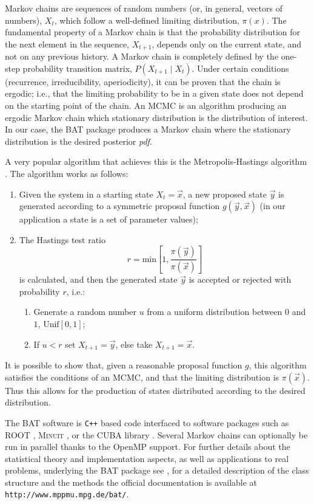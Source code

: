 Markov chains are sequences of random numbers (or, in general, vectors of numbers), $X_t$, which follow a well-defined limiting distribution, $\pi(x)$. The fundamental property of a Markov chain is that the probability distribution for the next element in the sequence, $X_{t+1}$, depends only on the current state, and not on any previous history. A Markov chain is completely defined by the one-step probability transition matrix, $P(X_{t+1}\mid X_t)$. Under certain conditions (recurrence, irreducibility, aperiodicity), it can be proven that the chain is ergodic; i.e., that the limiting probability to be in a given state does not depend on the starting point of the chain. An MCMC is an algorithm producing an ergodic Markov chain which stationary distribution is the distribution of interest. In our case, the BAT package produces a Markov chain where the stationary distribution is the desired posterior \emph{pdf}.

A very popular algorithm that achieves this is the Metropolis-Hastings algorithm \cite{Metropolis,Hastings}. The algorithm works as follows:
\begin{enumerate}
	\item Given the system in a starting state $X_t=\vec{x}$, a new proposed state $\vec{y}$ is generated according to a symmetric proposal function $g(\vec{y},\vec{x})$ (in our application a state is a set of parameter values);
	\item The Hastings test ratio
		\[r=\text{min}\left[1,\frac{\pi(\vec{y})}{\pi(\vec{x})}\right]\]
		is calculated, and then the generated state $\vec{y}$ is accepted or rejected with probability $r$, i.e.:
		\begin{enumerate}
			\item Generate a random number $u$ from a uniform distribution between $0$ and $1$, $\text{Unif}[0,1]$;
			\item If $u<r$ set $X_{t+1}=\vec{y}$, else take $X_{t+1}=\vec{x}$.
		\end{enumerate}
\end{enumerate}
It is possible to show that, given a reasonable proposal function $g$, this algorithm satisfies the conditions of an MCMC, and that the limiting distribution is $\pi(\vec{x})$. Thus this allows for the production of states distributed according to the desired distribution.

 The BAT software is \texttt{C++} based code interfaced to software packages such as ROOT \cite{ROOT}, \textsc{Minuit} \cite{MINUIT}, or the CUBA library \cite{CUBA}. Several Markov chains can optionally be run in parallel thanks to the OpenMP \cite{openmp} support. For further details about the statistical theory and implementation aspects, as well as applications to real problems, underlying the BAT package see \cite{BAT}, for a detailed description of the class structure and the methods the official documentation is available at \texttt{http://www.mppmu.mpg.de/bat/}.

